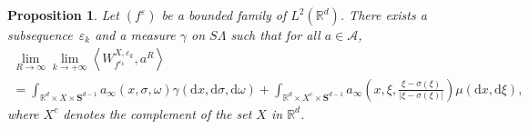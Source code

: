 \documentclass[10pt]{amsart}
\newtheorem{prop}[cdrthm]{Proposition}
\theoremstyle{definition}
\newcommand*\R{{\mathbb R}}
\newcommand*\eps{\varepsilon}
\numberwithin{equation}{section}
\newcommand*{\dd}{\mathrm{d}}
\newcommand*{\dx}{\dd x}
\newcommand*{\dxi}{\dd \xi}
\newcommand*{\dsigma}{\dd \sigma}
\newcommand*{\domega}{\dd \omega}
\begin{document}
\begin{prop}\label{prop4.4}
Let $(f^\eps)$ be a bounded family of $L^2(\R^d)$. There exists a subsequence~$\eps_k$ and a measure $\gamma$ on $S\Lambda$ such that for all $a\in{\mathcal A}$,
\begin{multline*}
\lim_{R\to\infty} \lim_{k\to +\infty}\left\langle W^{X,\eps_k}_{f^{\eps_k}},a^{R}\right\rangle\\
=\int_{\R^d\times X\times \mathbf{S}^{d-1}}\!a_\infty (x,\sigma,\omega) \gamma(\dx,\dsigma,\domega)
+
\int_{\R^d\times X^c\times \mathbf{S}^{d-1}}\!a_\infty\!\left(\!x,\xi,\frac{\xi-\sigma(\xi)}{|\xi-\sigma(\xi)|}\!\right)\!\mu(\dx,\dxi),
\end{multline*}
where $X^c$ denotes the complement of the set $X$ in $\R^d$.
\end{prop}
\end{document}
